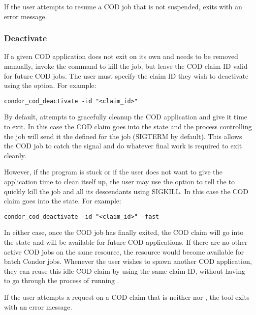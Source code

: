 If the user attempts to resume a COD job that is not suspended,
 exits with an error message.


\subsubsection{\label{sec:cod-claim-deactivate}Deactivate}

If a given COD application does not exit on its own and needs to be
removed manually, invoke the 
command to kill the job, but leave the COD claim ID valid for future
COD jobs.
The user must specify the claim ID they wish to deactivate using the
 option.
For example:
\begin{verbatim}
condor_cod_deactivate -id "<claim_id>"
\end{verbatim}

By default,  attempts to gracefully cleanup
the COD application and give it time to exit.
In this case the COD claim goes into the \verb@Vacating@ state and the
 process controlling the job will send it the 
 defined for the job (SIGTERM by default).
This allows the COD job to catch the signal and do whatever final work
is required to exit cleanly.

However, if the program is stuck or if the user does not want to give
the application time to clean itself up, the user may use the
 option to tell the  to quickly kill the
job and all its descendants using SIGKILL.
In this case the COD claim goes into the \verb@Killing@ state.
For example:
\begin{verbatim}
condor_cod_deactivate -id "<claim_id>" -fast
\end{verbatim}

In either case, once the COD job has finally exited, the COD claim
will go into the \verb@Idle@ state and will be available for future
COD applications.
If there are no other active COD jobs on the same resource, the
resource would become available for batch Condor jobs. 
Whenever the user wishes to spawn another COD application, they can
reuse this idle COD claim by using the same claim ID, without having
to go through the process of running .

If the user attempts a  request on a COD claim
that is neither \verb@Running@ nor \verb@Suspended@, the 
tool exits with an error message.


